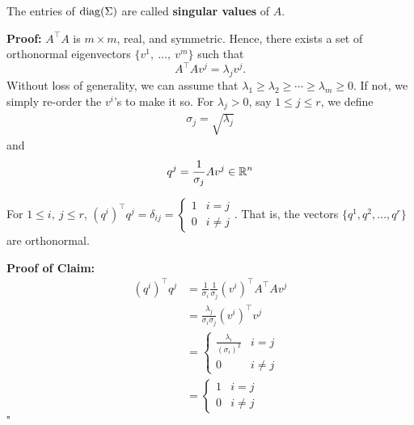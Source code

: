 \begin{rem}
   The entries of $\operatorname*{\rm diag}(\Sigma)$ are called \textbf{singular values} of $A$.
\end{rem}

\textbf{Proof:}
 $A^\top A$ is $m\times m$, real, and symmetric. Hence, there exists a set of orthonormal eigenvectors $\{v^1,\ \ldots,\ v^m\}$ such that 
 $$A^\top Av^j=\lambda_jv^j.$$ 
 Without loss of generality, we can assume that $
        \lambda_1\geq\lambda_2\geq\cdots\geq\lambda_m\geq0$.
    If not, we simply re-order the $v^i$'s to make it so. 
For $\lambda_j>0$, say $1\leq j\leq r$, we define
    \begin{align*}
        \sigma_j=\sqrt{\lambda_j}
    \end{align*}
    and
    \begin{equation*}
        q^j = \frac{1}{\sigma_j}Av^j\in\mathbb R^n
    \end{equation*}
\begin{claim} For $1\leq i,\ j\leq r$, $\left(q^i\right)^\top q^j=\delta_{ij}=
\begin{cases}
            1 & i=j\\
            0 & i\neq j
\end{cases}$. That is, the vectors $\{ q^1, q^2, \ldots, q^r\}$ are orthonormal.
         
\end{claim}

\textbf{Proof of Claim:}
    \begin{align*}
        \left(q^i\right)^\top q^j &= \frac{1}{\sigma_i}\frac{1}{\sigma_j}\left(v^i\right)^\top A^\top Av^j\\
        &=\frac{\lambda_j}{\sigma_i\sigma_j}\left(v^i\right)^\top v^j\\
        &= \begin{cases}
                \frac{\lambda_i}{\left(\sigma_i\right)^2} & i=j\\
                0 & i\neq j
            \end{cases}\\
        &= \begin{cases}
            1 & i=j\\
            0 & i\neq j
        \end{cases}
    \end{align*}
\hfill $\square$\\




